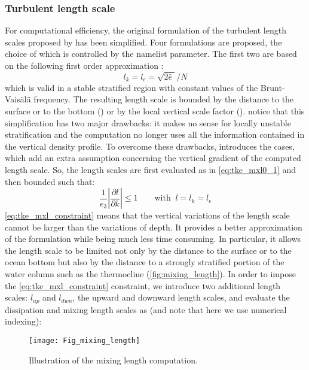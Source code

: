 \documentclass[../tex_main/NEMO_manual]{subfiles}
\begin{document}
\subsubsection{Turbulent length scale}
For computational efficiency, the original formulation of the turbulent length scales proposed by
\citet{Gaspar1990} has been simplified.
Four formulations are proposed, the choice of which is controlled by the  namelist parameter.
The first two are based on the following first order approximation \citep{Blanke1993}:
\begin{equation} \label{eq:tke_mxl0_1}
l_k = l_\epsilon = \sqrt {2 \bar{e}\; } / N
\end{equation}
which is valid in a stable stratified region with constant values of the Brunt-Vais\"{a}l\"{a} frequency.
The resulting length scale is bounded by the distance to the surface or to the bottom
() or by the local vertical scale factor ().
\citet{Blanke1993} notice that this simplification has two major drawbacks:
it makes no sense for locally unstable stratification and the computation no longer uses all
the information contained in the vertical density profile.
To overcome these drawbacks, \citet{Madec1998} introduces the  cases,
which add an extra assumption concerning the vertical gradient of the computed length scale.
So, the length scales are first evaluated as in \autoref{eq:tke_mxl0_1} and then bounded such that:
\begin{equation} \label{eq:tke_mxl_constraint}
\frac{1}{e_3 }\left| {\frac{\partial l}{\partial k}} \right| \leq 1
\qquad \text{with }\  l =  l_k = l_\epsilon
\end{equation}
\autoref{eq:tke_mxl_constraint} means that the vertical variations of the length scale cannot be larger than
the variations of depth.
It provides a better approximation of the \citet{Gaspar1990} formulation while being much less 
time consuming.
In particular, it allows the length scale to be limited not only by the distance to the surface or
to the ocean bottom but also by the distance to a strongly stratified portion of the water column such as
the thermocline (\autoref{fig:mixing_length}).
In order to impose the \autoref{eq:tke_mxl_constraint} constraint, we introduce two additional length scales:
$l_{up}$ and $l_{dwn}$, the upward and downward length scales, and
evaluate the dissipation and mixing length scales as
(and note that here we use numerical indexing):
\begin{figure}[!t] \begin{center}
\texttt{[image: Fig\_mixing\_length]}
\caption{ \protect\label{fig:mixing_length} 
Illustration of the mixing length computation. }
\end{center}  
\end{figure}
\end{document}
